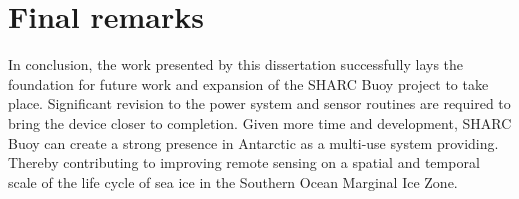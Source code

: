 \pagebreak
\section{Final remarks}
In conclusion, the work presented by this dissertation successfully lays the foundation for future work and expansion of the SHARC Buoy project to take place. Significant revision to the power system and sensor routines are required to bring the device closer to completion. Given more time and development, SHARC Buoy can create a strong presence in Antarctic as a multi-use system providing. Thereby contributing to improving remote sensing on a spatial and temporal scale of the life cycle of sea ice in the Southern Ocean Marginal Ice Zone.